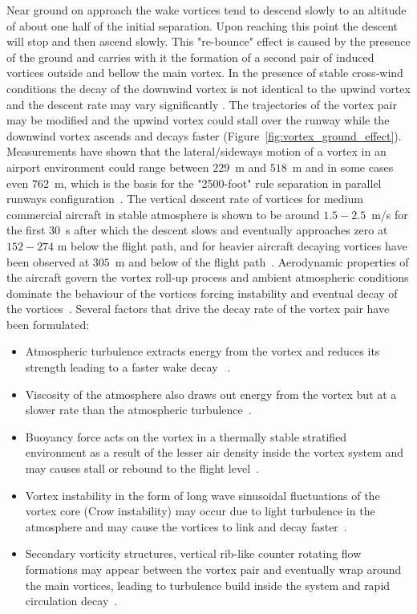 Near ground on approach the wake vortices tend to descend slowly to an altitude of about one half of the initial separation.
Upon reaching this point the descent will stop and then ascend slowly. This "re-bounce" effect is caused by the presence of the ground and carries with it the formation of a second pair of induced vortices outside and bellow the main vortex. 
In the presence of stable cross-wind conditions the decay of the downwind vortex is not identical to the upwind vortex and the descent rate may vary significantly \cite{Hallock2018Apr}. 
The trajectories of the vortex pair may be modified and the upwind vortex could stall over the runway while the downwind vortex ascends and decays faster (Figure~\ref{fig:vortex_ground_effect}).
Measurements have shown that the lateral/sideways motion of a vortex in an airport environment could range between $229$~m and $518$~m and in some cases even $762$~m, which is the basis for the "2500-foot"  rule separation in parallel runways configuration~\cite{Hallock2018Apr, hallock2004summary, hallock2003wake}. The vertical descent rate of vortices for medium commercial aircraft in stable atmosphere  is shown to be around $1.5-2.5$~m/s for the first $30$~s after which the descent slows and eventually approaches zero at $152-274$ m below the flight path, and for heavier aircraft decaying vortices have been observed at $305$~m and below of the flight path~\cite{lissaman1973aircraft, Hallock2018Apr}. 
Aerodynamic properties of the aircraft govern the vortex roll-up process and ambient atmospheric conditions dominate the behaviour of the vortices forcing instability and eventual decay of the vortices~\cite{Hallock2018Apr}.
Several factors that drive the decay rate of the vortex pair have been formulated:
\begin{itemize}
    \item Atmospheric turbulence extracts energy from the vortex and reduces its strength leading to a faster wake decay ~\cite{Hallock2018Apr}.
    \item Viscosity of the atmosphere also draws out energy from the vortex but at a slower rate than the atmospheric turbulence~\cite{Hallock2018Apr}.
    \item Buoyancy force acts on the vortex in a thermally stable stratified environment as a result of the lesser air density inside the vortex system and may causes stall or rebound to the flight level~\cite{Holzapfel2001Feb, gerz_commercial_2002}.
    \item Vortex instability in the form of long wave sinusoidal fluctuations of the vortex core (Crow instability) may occur due to light turbulence in the atmosphere and may cause the vortices to link and decay faster~\cite{Hallock2018Apr, crow2003stability}.
    \item Secondary vorticity structures, vertical rib-like counter rotating flow formations may appear between the vortex pair and eventually wrap around the main vortices, leading to turbulence build inside the system and rapid circulation decay~\cite{Holzapfel2001Feb, Holzapfel2003Jun}.
\end{itemize}


